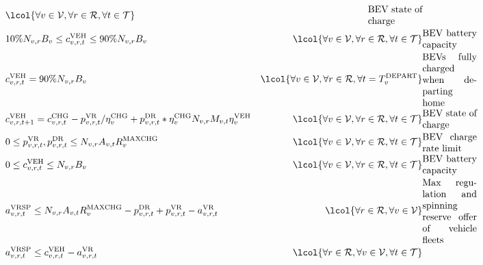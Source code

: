 \documentclass[9pt,twoside,lineno]{pnas-new}
\begin{document}
\begin{table}
\begin{align}
 &    \lcol{\forall v\in \mathcal{V}, \forall r\in \mathcal{R}, \forall t\in \mathcal{T}}
 & \parbox{2cm}{\textrm{BEV state of charge}}
  \label{eq3} \\
 & 10\% N_{v,r}B_{v} \leq c^{\mathrm{VEH}}_{v,r,t} \leq 90\% N_{v,r}B_{v}
 &    \lcol{\forall v\in \mathcal{V}, \forall r\in \mathcal{R}, \forall t\in \mathcal{T}}
 & \parbox{2cm}{\textrm{BEV battery capacity}}
  \label{eq3}\\
 & c^{\mathrm{VEH}}_{v,r,t} = 90\% N_{v,r}B_{v}
 &    \lcol{\forall v\in \mathcal{V}, \forall r\in \mathcal{R}, \forall t=T_v^{\mathrm{DEPART}}}
 & \parbox{2cm}{\textrm{BEVs fully charged when departing home}}
  \label{eq3}\\
 & c^{\mathrm{VEH}}_{v,r,t+1}=c^{\mathrm{CHG}}_{v,r,t} -  p^{\mathrm{VR}}_{v,r,t}/\eta^{\mathrm{CHG}}_v + p^{\mathrm{DR}}_{v,r,t}*\eta^{\mathrm{CHG}}_v N_{v,r}M_{v,t}\eta^{\mathrm{VEH}}_{v}
 &    \lcol{\forall v\in \mathcal{V}, \forall r\in \mathcal{R}, \forall t\in \mathcal{T}}
 & \parbox{2cm}{\textrm{BEV state of charge}}
  \label{eq3} \\
 &  0 \leq p^{\mathrm{VR}}_{v,r,t},p^{\mathrm{DR}}_{v,r,t} \leq N_{v,r}A_{v,t}R^{\mathrm{MAXCHG}}_v
 &    \lcol{\forall v\in \mathcal{V}, \forall r\in \mathcal{R}, \forall t\in \mathcal{T}}
 & \parbox{2cm}{\textrm{BEV charge rate limit}}
  \label{eq3} \\
 & 0 \leq c^{\mathrm{VEH}}_{v,r,t} \leq N_{v,r}B_{v}
 &    \lcol{\forall v\in \mathcal{V}, \forall r\in \mathcal{R}, \forall t\in \mathcal{T}}
 & \parbox{2cm}{\textrm{BEV battery capacity}}
  \label{eq3}\\
     & a^{\mathrm{VRSP}}_{v,r,t}\leq N_{v,r}A_{v,t}R^{\mathrm{MAXCHG}}_v
   - p^{\mathrm{DR}}_{v,r,t}+p^{\mathrm{VR}}_{v,r,t}-a^{\mathrm{VR}}_{v,r,t}
   & \lcol{\forall r\in \mathcal{R},\forall v\in \mathcal{V}}
 & \parbox{2cm}{\textrm{Max regulation and spinning reserve offer of vehicle fleets}}\nonumber
 \label{eq4str} \\
    & a^{\mathrm{VRSP}}_{v,r,t}\leq c^{\mathrm{VEH}}_{v,r,t}-a^{\mathrm{VR}}_{v,r,t}
   & \lcol{\forall r\in \mathcal{R},\forall v\in \mathcal{V}, \forall t\in \mathcal{T}}
 & \parbox{2cm}{\textrm{}}
 \label{eq5str} \\
\end{align}
\end{table}
\end{document}
